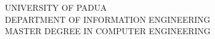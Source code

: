 \begin{titlepage}

		\thispagestyle{empty}
    \begin{figure}
    \centering
      \quad     {}
    \end{figure}
    
    \vskip 3cm{
    \begin{center}\sc
        UNIVERSITY OF PADUA\\
        DEPARTMENT OF INFORMATION ENGINEERING\\
        MASTER DEGREE IN COMPUTER ENGINEERING\end{center}
		}
		

\end{titlepage}

